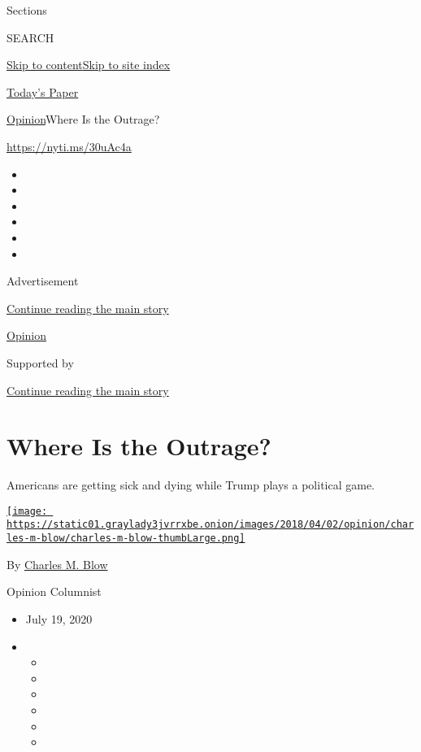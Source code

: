 Sections

SEARCH

\protect\hyperlink{site-content}{Skip to
content}\protect\hyperlink{site-index}{Skip to site index}

\href{https://myaccount.nytimes3xbfgragh.onion/auth/login?response_type=cookie\&client_id=vi}{}

\href{https://www.nytimes3xbfgragh.onion/section/todayspaper}{Today's
Paper}

\href{/section/opinion}{Opinion}\textbar{}Where Is the Outrage?

\url{https://nyti.ms/30uAc4a}

\begin{itemize}
\item
\item
\item
\item
\item
\item
\end{itemize}

Advertisement

\protect\hyperlink{after-top}{Continue reading the main story}

\href{/section/opinion}{Opinion}

Supported by

\protect\hyperlink{after-sponsor}{Continue reading the main story}

\hypertarget{where-is-the-outrage}{%
\section{Where Is the Outrage?}\label{where-is-the-outrage}}

Americans are getting sick and dying while Trump plays a political game.

\href{https://www.nytimes3xbfgragh.onion/by/charles-m-blow}{\texttt{[image: https://static01.graylady3jvrrxbe.onion/images/2018/04/02/opinion/charles-m-blow/charles-m-blow-thumbLarge.png]}}

By \href{https://www.nytimes3xbfgragh.onion/by/charles-m-blow}{Charles
M. Blow}

Opinion Columnist

\begin{itemize}
\item
  July 19, 2020
\item
  \begin{itemize}
  \item
  \item
  \item
  \item
  \item
  \item
  \end{itemize}
\end{itemize}

